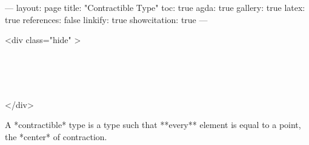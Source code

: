 ---
layout: page
title: "Contractible Type"
toc: true
agda: true
gallery: true
latex: true
references: false
linkify: true
showcitation: true
---

<div class="hide" >
\begin{code}%
\>[0]\AgdaSymbol{\{-\#}\AgdaSpace{}%
\AgdaSpace{}%
\AgdaSpace{}%
\AgdaSymbol{\#-\}}\<%
\\
\>[0]\AgdaSpace{}%
\AgdaSpace{}%
\<%
\\
\>[0]\AgdaSpace{}%
\AgdaSpace{}%
\<%
\\
\>[0]\AgdaSpace{}%
\AgdaSpace{}%
\<%
\end{code}
</div>


\begin{code}%
\>[0]\AgdaSpace{}%
\AgdaSpace{}%
\<%
\end{code}

A *contractible* type is a type such that **every**
element is equal to a point, the *center* of contraction.

\begin{code}%
\>[0][@{}l@{\AgdaIndent{1}}]%
\>[2]\AgdaComment{}\<%
\\
%
\>[2]\<%
\\
\>[2][@{}l@{\AgdaIndent{0}}]%
\>[4]\AgdaSymbol{:}\AgdaSpace{}%
\AgdaSpace{}%
\AgdaSymbol{\{}\AgdaSymbol{\}}\<%
\\
%
\>[4]\AgdaSpace{}%
\AgdaSymbol{(}\AgdaSpace{}%
\AgdaSymbol{:}\AgdaSpace{}%
\AgdaSpace{}%
\AgdaSymbol{)}\<%
\\
%
\>[4]\AgdaComment{--------------}\<%
\\
%
\>[4]\AgdaSpace{}%
\AgdaSpace{}%
\<%
\\
%
\\[\AgdaEmptyExtraSkip]%
%
\>[2]\AgdaSpace{}%
\AgdaSpace{}%
\AgdaSymbol{=}\AgdaSpace{}%
\AgdaSpace{}%
\AgdaSpace{}%
\AgdaSpace{}%
\AgdaSpace{}%
\AgdaSpace{}%
\AgdaSymbol{((}\AgdaSpace{}%
\AgdaSymbol{:}\AgdaSpace{}%
\AgdaSymbol{)}\AgdaSpace{}%
\AgdaSpace{}%
\AgdaSpace{}%
\AgdaOperator{\AgdaDatatype{==}}\AgdaSpace{}%
\AgdaSymbol{))}\<%
\\
\>[0]\<%
\end{code}


